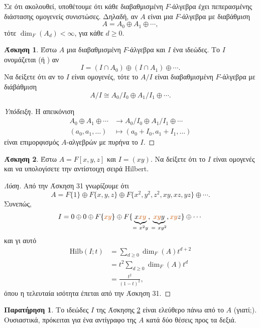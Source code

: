 \documentclass[12pt,a4paper,reqno]{amsart}
\makeatletter
\theoremstyle{definition}
\newtheorem{exercise}{Άσκηση}
\newtheorem*{remark}{Παρατήρηση}
\renewcommand{\to}{\rightarrow}
\newcommand{\Hilb}{\mathrm{Hilb}}
\newcommand{\defn}[1]{{\color{mylightblue}{#1}}}
\def\mathcolor#1#{\@mathcolor{#1}}
\def\@mathcolor#1#2#3{%
  \protect\leavevmode
  \begingroup
    \color#1{#2}#3%
  \endgroup
}
\makeatother
\begin{document}
Σε ότι ακολουθεί, υποθέτουμε ότι κάθε διαβαθμισμένη $F$-άλγεβρα έχει πεπερασμένης διάστασης ομογενείς συνιστώσες. Δηλαδή, αν $A$ είναι μια $F$-άλγεβρα με διαβάθμιση
\[
A = A_0 \oplus A_1 \oplus \cdots, 
\]
τότε $\dim_F(A_d) < \infty$, για κάθε $d \ge 0$.

\begin{exercise}
  \label{ex:graded_ideal}
  Έστω $A$ μια διαβαθμισμένη $F$-άλγεβρα και $I$ ένα ιδεώδες. Το $I$ ονομάζεται \defn{ομογενές} (ή \defn{διαβαθμισμένο}) αν 
  \[
  I = \left(
    I \cap A_0
  \right) \oplus \left(
    I \cap A_1
  \right) \oplus \cdots.
  \]
  Να δείξετε ότι αν το $I$ είναι ομογενές, τότε το $A/I$ είναι διαβαθμισμένη $F$-άλγεβρα με διάβάθμιση
  \[
  A/I \cong A_0/I_0 \oplus A_1/I_1 \oplus \cdots.
  \]
\end{exercise}

\begin{proof}[Yπόδειξη]
  Η απεικόνιση 
  \begin{align*}
    A_0 \oplus A_1 \oplus \cdots &\to A_0/I_0 \oplus A_1/I_1 \oplus \cdots \\ 
  (a_0, a_1, \dots) &\mapsto (a_0 + I_0, a_1 + I_1, \dots)
  \end{align*}
  είναι επιμορφισμός $A$-αλγεβρών με πυρήνα το $I$.
\end{proof}

\begin{exercise}
  \label{ex:graded_ideal_example}
  Έστω $A = F[x,y,z]$ και $I = (xy)$. Να δείξετε ότι το $I$ είναι ομογενές και να υπολογίσετε την αντίστοιχη σειρά Hilbert.
\end{exercise}

\begin{proof}[Λύση]
  Από την Άσκηση 31 γνωρίζουμε ότι 
  \[
  A = F\{1\} \oplus F\{x,y,z\} \oplus F\{x^2,y^2,z^2,xy,xz,yz\} \oplus \cdots.
  \]
  Συνεπώς, 
  \[
  I = 0 \oplus 0 \oplus F\{\mathcolor{burntorange}{xy}\} \oplus F\{\underbrace{x\mathcolor{burntorange}{xy}}_{= \ x^2y}, \underbrace{\mathcolor{burntorange}{xy}y}_{= \ xy^2}, \mathcolor{burntorange}{xy}z\} \oplus \cdots
  \]
  και γι αυτό 
  \begin{align*}
  \Hilb(I;t) &= \sum_{d \ge 0} \dim_F(A) t^{d+2} \\
  &= t^2 \sum_{d \ge 0} \dim_F(A) t^{d} \\
  &= \frac{t^2}{(1-t)^2},
  \end{align*}
  όπου η τελευταία ισότητα έπεται από την Άσκηση 31.
\end{proof}

\begin{remark}
  Το ιδεώδες $I$ της Άσκησης \ref{ex:graded_ideal_example} είναι ελεύθερο πάνω από το $A$ (γιατί;). Ουσιαστικά, πρόκειται για ένα αντίγραφο της $A$  κατά δύο θέσεις προς τα δεξιά.
\end{remark}
\end{document}
